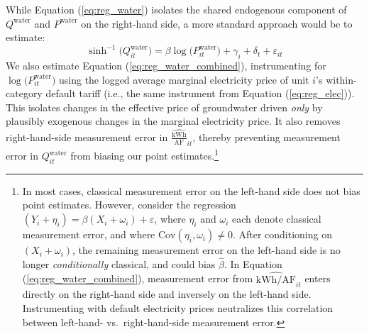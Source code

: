 While Equation (\ref{eq:reg_water}) isolates the shared endogenous component of $Q^{\text{water}}$ and $P^{\text{water}}$ on the right-hand side, a more standard approach would be to estimate:
\begin{equation}
\sinh^{-1}\big(Q^{\text{water}}_{it}\big) = \beta\log\big({P}^{\text{water}}_{it}\big) + \gamma_{i} + \delta_t + \varepsilon_{it} \label{eq:reg_water_combined} 
\end{equation}
We also estimate Equation (\ref{eq:reg_water_combined}), instrumenting for $\log\big({P}^{\text{water}}_{it}\big)$ using the logged average marginal electricity price of unit $i$'s within-category default tariff (i.e., the same instrument from Equation (\ref{eq:reg_elec})). This isolates changes in the effective price of groundwater driven \emph{only} by plausibly exogenous changes in the marginal electricity price. It also removes right-hand-side measurement error in  $\widehat{\tfrac{{\text{kWh}}}{\text{AF}}}_{it}$, thereby preventing measurement error in $Q^{\text{water}}_{it}$ from biasing our point estimates.\footnote{
In most cases, classical measurement error on the left-hand side does not bias point estimates. However, consider the regression  $(Y_i + \eta_i) = \beta (X_i + \omega_i) + \varepsilon$, where $\eta_i$ and $\omega_i$ each denote classical measurement error, and where $\newcommand{\Cov}{\mathrm{Cov}} \Cov(\eta_i,\omega_i)\ne0$. After conditioning on $(X_i + \omega_i)$, the remaining measurement error on the left-hand side is no longer \emph{conditionally} classical, and could bias $\hat\beta$. In Equation (\ref{eq:reg_water_combined}),  measurement error from $\widehat{{{\text{kWh}}}\big/{\text{AF}}}_{it}$ enters directly on the right-hand side and inversely on the left-hand side.  Instrumenting with default electricity prices neutralizes this correlation between left-hand- vs.\ right-hand-side measurement error.
}


